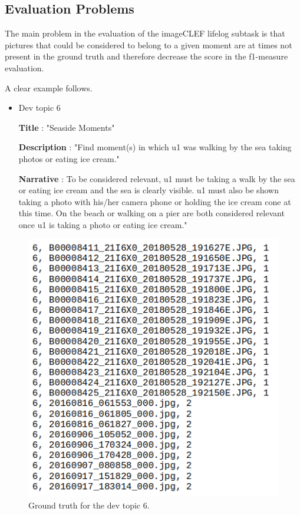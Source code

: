     \subsection{Evaluation Problems}
    \label{sec:ev_problems}

    The main problem in the evaluation of the imageCLEF lifelog subtask is that  pictures that could be considered to belong to a given moment are at times not present in the ground truth and therefore decrease the score in the f1-measure evaluation.

    A clear example follows.

    \begin{itemize}

        \item Dev topic 6
        

        \textbf{Title} : "Seaside Moments"

        \textbf{Description} : "Find moment(s) in which u1 was walking by the
        sea taking photos or eating ice cream."

        \textbf{Narrative} : To be considered relevant, u1 must be taking a
        walk by the sea or eating ice cream and the sea is clearly
        visible. u1 must also be shown taking a photo with his/her camera
        phone or holding the ice cream cone at this time. On the beach or
        walking on a pier are both considered relevant once u1 is taking a
        photo or eating ice cream."

        \end{itemize}

        \begin{figure}[htb]
            \centering
            \captionsetup{justification=centering}
            \includegraphics[width =  0.5 \textwidth]{Sections/5ImageClef/images/t6_gt.png}
            \caption{Ground truth for the dev topic 6.}  
           \label{fig:dataset_csv}
        \end{figure}
    
